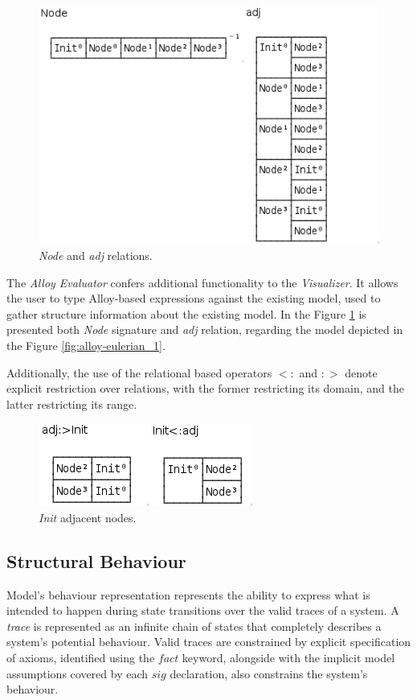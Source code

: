\begin{figure}[H]
    \centering
    \includegraphics[width=0.4\linewidth]{images/alloy_evaluator1.png}
    \caption{\textit{Node} and \textit{adj} relations.}
    \label{fig:alloy-evaluator_1}
\end{figure}

The \textit{Alloy Evaluator} \cite{alloy-6} confers additional functionality to the \textit{Visualizer}. It allows the user to type Alloy-based expressions against the existing model, used to gather structure information about the existing model. \cite{alloy-docs} In the Figure \ref{fig:alloy-evaluator_1} is presented both \textit{Node} signature and \textit{adj} relation, regarding the model depicted in the Figure \ref{fig:alloy-eulerian_1}.

Additionally, the use of the relational based operators $<:$ and $:>$ denote explicit restriction over relations, with the former restricting its domain, and the latter restricting its range.

\begin{figure}[H]
    \centering
    \includegraphics[width=0.4\linewidth]{images/alloy_evaluator2.png}
    \caption{\textit{Init} adjacent nodes.}
    \label{fig:alloy-evaluator_2}
\end{figure}


\subsection{Structural Behaviour}

Model's behaviour representation represents the ability to express what is intended to happen during state transitions over the valid traces of a system. A \textit{trace} is represented as an infinite chain of states that completely describes a system's potential behaviour. Valid traces are constrained by explicit specification of axioms, identified using the $fact$ keyword, alongside with the implicit model assumptions covered by each $sig$ declaration, also constrains the system's behaviour.

